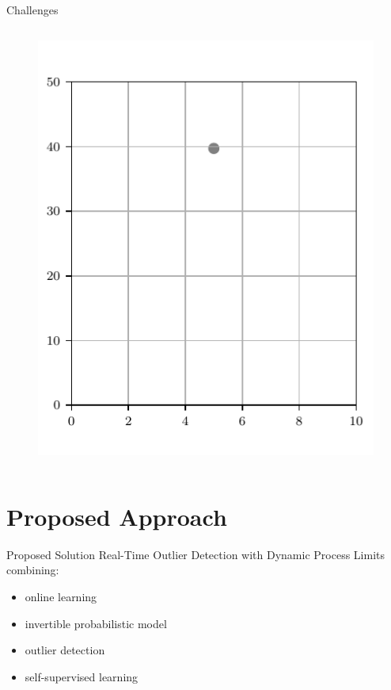 \documentclass[aspectratio=169]{beamer}
\begin{document}
\begin{frame}{Challenges}
\begin{columns}
\begin{column}{0.38\textwidth}
{\begin{figure}
                    \includegraphics[width=\textwidth]{../ilustrate/pc2023/sample/unlabeled_data_0.pdf}
                \end{figure}
            }
        \end{column}
    \end{columns}
    
\end{frame}

\section{Proposed Approach}

\begin{frame}{Proposed Solution}
    Real-Time Outlier Detection with Dynamic Process Limits
    combining:
    \begin{itemize}
        \item online learning
        \item invertible probabilistic model
        \item outlier detection
        \item self-supervised learning
    \end{itemize}
\end{frame}
\end{document}
